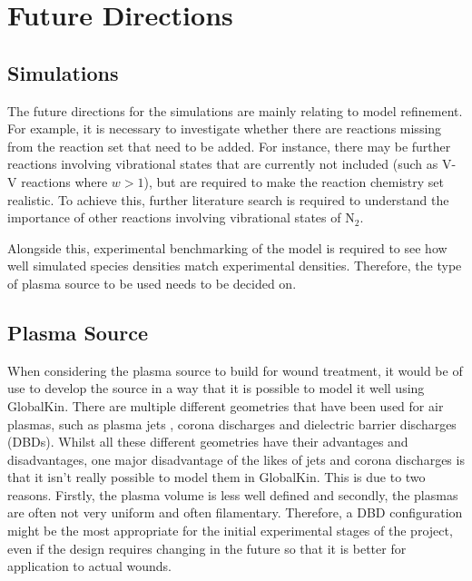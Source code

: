 \documentclass[11pt, oneside]{article}   	%
\begin{document}
\section{Future Directions}
\subsection{Simulations}
The future directions for the simulations are mainly relating to model refinement.
For example, it is necessary to investigate whether there are reactions missing from the reaction set that need to be added.
For instance, there may be further reactions involving vibrational states that are currently not included (such as V-V reactions where $w > 1$), but are required to make the reaction chemistry set realistic.
To achieve this, further literature search is required to understand the importance of other reactions involving vibrational states of N$_2$.

Alongside this, experimental benchmarking of the model is required to see how well simulated species densities match experimental densities.
Therefore, the type of plasma source to be used needs to be decided on.

\subsection{Plasma Source}

When considering the plasma source to build for wound treatment, it would be of use to develop the source in a way that it is possible to model it well using GlobalKin.
There are multiple different geometries that have been used for air plasmas, such as plasma jets \cite{Pei2012inactivation, Chen2009blood, Walsh2011portable}, corona discharges \cite{Dobrynin2011inactivation} and dielectric barrier discharges (DBDs).
Whilst all these different geometries have their advantages and disadvantages, one major disadvantage of the likes of jets and corona discharges is that it isn't really possible to model them in GlobalKin.
This is due to two reasons.
Firstly, the plasma volume is less well defined and secondly, the plasmas are often not very uniform and often filamentary.
Therefore, a DBD configuration might be the most appropriate for the initial experimental stages of the project, even if the design requires changing in the future so that it is better for application to actual wounds.
\end{document}

